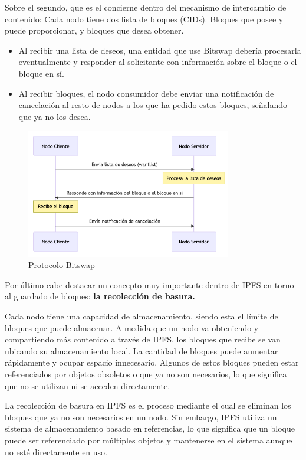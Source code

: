 Sobre el segundo, que es el concierne dentro del mecanismo de intercambio de contenido: Cada nodo tiene dos lista de bloques (CIDs). Bloques que posee y puede
proporcionar, y bloques que desea obtener.
\begin{itemize}[itemsep=1pt]
      \item Al recibir una lista de deseos, una entidad que use Bitswap debería procesarla eventualmente y responder al solicitante con información sobre el bloque o el bloque en sí.
      \item Al recibir bloques, el nodo consumidor debe enviar una notificación de cancelación al resto de nodos a los que ha pedido estos bloques, señalando que  ya no los desea.
\end{itemize}


\begin{figure}[H]
      \centering
      \includegraphics[width=0.8\textwidth]{images/bitswap.png}
      \caption{Protocolo Bitswap}
      \label{bitswap}
\end{figure}


Por último cabe destacar un concepto muy importante dentro de IPFS en torno al guardado de bloques:
\textbf{la recolección de basura.}

Cada nodo tiene una capacidad
de almacenamiento, siendo esta el límite de bloques que puede almacenar. A medida que un nodo va obteniendo y compartiendo más
contenido a través de IPFS, los bloques que recibe se van ubicando su almacenamiento local. La cantidad de bloques puede aumentar
rápidamente y ocupar espacio innecesario. Algunos de estos bloques pueden estar referenciados por objetos obsoletos o que ya no son
necesarios, lo que significa que no se utilizan ni se acceden directamente.

La recolección de basura en IPFS es el proceso mediante el cual se eliminan los bloques que ya no son necesarios en un nodo. Sin embargo, IPFS utiliza un sistema de almacenamiento basado en referencias, lo que significa que un bloque puede ser referenciado por múltiples objetos y mantenerse en el sistema aunque no esté directamente en uso.

